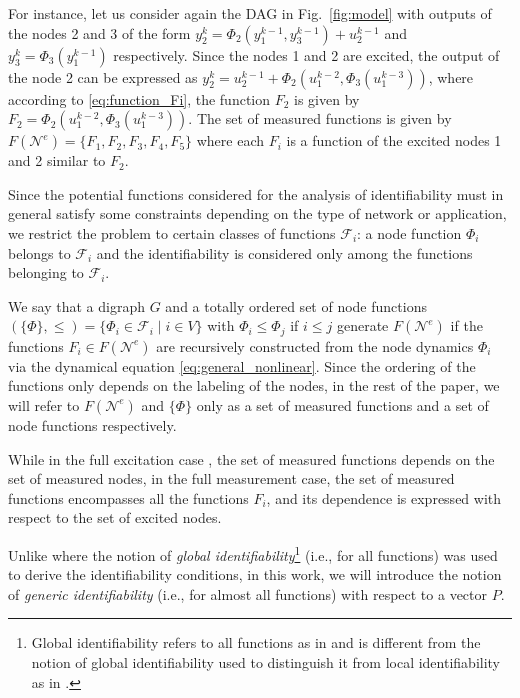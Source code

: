 \documentclass[letterpaper,10pt,journal]{IEEEtran}
\newcommand{\F}{\mathcal{F}}
\newcommand{\NN}{\mathcal{N}}
\begin{document}
For instance, let us consider again the DAG in Fig.~\ref{fig:model} with outputs of the nodes 2 and 3 of the form $y_2^k=\Phi_2(y_1^{k-1},y_3^{k-1})+u_2^{k-1}$ and $y_3^k=\Phi_3(y_1^{k-1})$ respectively. Since the nodes 1 and 2 are excited, the output of the node 2 can be expressed as $y_2^k=u_2^{k-1}+\Phi_2(u_1^{k-2},\Phi_3(u_1^{k-3}))$, where according to \eqref{eq:function_Fi}, the function $F_2$ is given by $F_2=\Phi_2(u_1^{k-2},\Phi_3(u_1^{k-3}))$. The set of measured functions is given by $F(\NN^e)=\{F_1,F_2,F_3,F_4,F_5 \}$ where each $F_i$ is a function of the excited nodes 1 and 2 similar to $F_2$.

Since the potential functions considered for the analysis of identifiability must in general satisfy some constraints 
depending on the type of network or application, we restrict the problem to certain classes of functions $\F_i$: a node function $\Phi_i$ belongs to $\F_i$ and the identifiability is considered only among the functions belonging to $\F_i$. 

We say that a digraph $G$ and a totally ordered set of node functions $(\{ \Phi\},\leq)=\{\Phi_i\in \F_i\;|\;i\in V\}$ with $\Phi_i\leq \Phi_j$ if $i\leq j$ generate $F(\mathcal{N}^e)$ if the functions $F_i \in F(\mathcal{N}^e)$ are recursively constructed from the node dynamics $\Phi_i$ via the dynamical equation \eqref{eq:general_nonlinear}. Since the ordering of the functions only depends on the labeling of the nodes, in the rest of the paper, we will refer to $F(\mathcal{N}^e)$ and  $\{ \Phi\}$ only as a set of measured functions and a set of node functions respectively.

While in the full excitation case \cite{vizuete2023nonlinear,vizuete2026nonlinear}, the set of measured functions depends on the set of measured nodes, in the full measurement case, the set of measured functions encompasses all the functions $F_i$, and its dependence is expressed with respect to the set of excited nodes.


Unlike \cite{vizuete2023nonlinear,vizuete2026nonlinear} where the notion of \emph{global identifiability}\footnote{Global identifiability refers to all functions as in \cite{vanwaarde2020necessary} and is different from the notion of global identifiability used to distinguish it from local identifiability as in \cite{legat2024identifiability}.} (i.e., for all functions) was used to derive the identifiability conditions, in this work, we will introduce the notion of \emph{generic identifiability} (i.e., for almost all functions) with respect to a vector $P$.  
\end{document}
